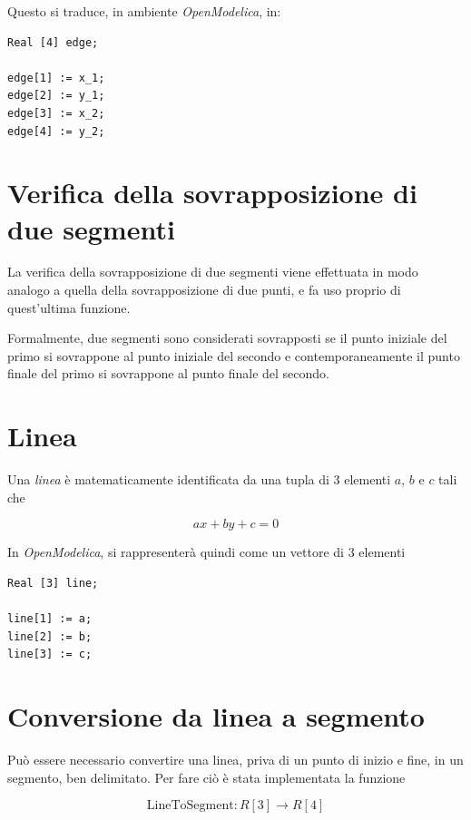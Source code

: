 \documentclass[11pt,a4paper]{report}
\newcommand{\modelicaclass}[1]{
	
}
\begin{document}
Questo si traduce, in ambiente \textit{OpenModelica}, in:

\begin{lstlisting}[language=Modelica]
Real [4] edge;

edge[1] := x_1;
edge[2] := y_1;
edge[3] := x_2;
edge[4] := y_2;
\end{lstlisting}

\section{Verifica della sovrapposizione di due segmenti}

La verifica della sovrapposizione di due segmenti viene effettuata in modo analogo a quella della sovrapposizione di due punti, e fa uso proprio di quest'ultima funzione.

Formalmente, due segmenti sono considerati sovrapposti se il punto iniziale del primo si sovrappone al punto iniziale del secondo e contemporaneamente il punto finale del primo si sovrappone al punto finale del secondo.

\begin{figure}[H]
\modelicaclass{EdgesAreClose.mo}
\end{figure}

\section{Linea}

Una \textit{linea} è matematicamente identificata da una tupla di 3 elementi $a$, $b$ e $c$ tali che

\[
a x + b y + c = 0
\]

In \textit{OpenModelica}, si rappresenterà quindi come un vettore di 3 elementi
\begin{lstlisting}[language=Modelica]
Real [3] line;

line[1] := a;
line[2] := b;
line[3] := c;
\end{lstlisting}

\section{Conversione da linea a segmento}

Può essere necessario convertire una linea, priva di un punto di inizio e fine, in un segmento, ben delimitato. Per fare ciò è stata implementata la funzione

\[
	\text{LineToSegment} : R[3] \longrightarrow R[4]
\]
\end{document}
